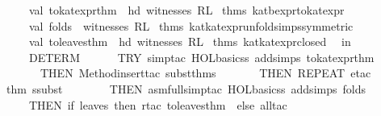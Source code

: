 \begin{isabellebody}
\ \ \ \ val\ to{}kat{}expr{}thm\ {}\ hd\ {}witnesses\ RL\ %
\isaantiq
thms\ kat{}bexpr{}to{}kat{}expr{}%
\endisaantiq
{}\isanewline
\ \ \ \ val\ folds\ {}\ witnesses\ RL\ %
\isaantiq
thms\ kat{}kat{}expr{}unfold{}simps{}symmetric{}{}%
\endisaantiq
\isanewline
\ \ \ \ val\ to{}leaves{}thm\ {}\ hd\ {}witnesses\ RL\ %
\isaantiq
thms\ kat{}kat{}expr{}closed{}%
\endisaantiq
{}\isanewline
\ \ in\isanewline
\ \ \ \ DETERM\isanewline
\ \ \ \ \ \ {}TRY\ {}simp{}tac\ {}HOL{}basic{}ss\ addsimps\ {}to{}kat{}expr{}thm{}{}\ {}{}\isanewline
\ \ \ \ \ \ THEN\ Method{}insert{}tac\ subst{}thms\ {}\isanewline
\ \ \ \ \ \ THEN\ REPEAT\ {}etac\ %
\isaantiq
thm\ ssubst{}%
\endisaantiq
\ {}{}\isanewline
\ \ \ \ \ \ THEN\ asm{}full{}simp{}tac\ {}HOL{}basic{}ss\ addsimps\ folds{}\ {}{}\isanewline
\ \ \ \ THEN\ {}if\ leaves\ then\ rtac\ to{}leaves{}thm\ {}\ else\ all{}tac{}\isanewline

\end{isabellebody}
